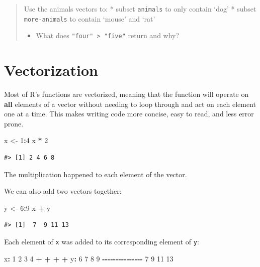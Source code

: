 \documentclass[
]{book}
\newenvironment{Shaded}{\begin{snugshade}}{\end{snugshade}}
\newcommand{\DecValTok}[1]{\textcolor[rgb]{0.00,0.00,0.81}{#1}}
\newcommand{\NormalTok}[1]{#1}
\newcommand{\OtherTok}[1]{\textcolor[rgb]{0.56,0.35,0.01}{#1}}
\newcommand{\SpecialCharTok}[1]{\textcolor[rgb]{0.81,0.36,0.00}{\textbf{#1}}}
\providecommand{\tightlist}{%
  \setlength{\itemsep}{0pt}\setlength{\parskip}{0pt}}
\begin{document}
\begin{quote}
Use the animals vectors to:
* subset \texttt{animals} to only contain `dog'
* subset \texttt{more-animals} to contain `mouse' and `rat'

\begin{itemize}
\tightlist
\item
  What does \texttt{"four"\ \textgreater{}\ "five"} return and why?
\end{itemize}
\end{quote}

\section{Vectorization}\label{vectorization}

Most of R's functions are vectorized, meaning that the function will operate on \textbf{all} elements of a vector without needing to loop through and act on each element one at a time. This makes writing code more concise, easy to read, and less error prone.

\begin{Shaded}
\begin{Highlighting}[]
\NormalTok{x }\OtherTok{\textless{}{-}} \DecValTok{1}\SpecialCharTok{:}\DecValTok{4}
\NormalTok{x }\SpecialCharTok{*} \DecValTok{2}
\end{Highlighting}
\end{Shaded}

\begin{verbatim}
#> [1] 2 4 6 8
\end{verbatim}

The multiplication happened to each element of the vector.

We can also add two vectors together:

\begin{Shaded}
\begin{Highlighting}[]
\NormalTok{y }\OtherTok{\textless{}{-}} \DecValTok{6}\SpecialCharTok{:}\DecValTok{9}
\NormalTok{x }\SpecialCharTok{+}\NormalTok{ y}
\end{Highlighting}
\end{Shaded}

\begin{verbatim}
#> [1]  7  9 11 13
\end{verbatim}

Each element of \texttt{x} was added to its corresponding element of \texttt{y}:

\begin{Shaded}
\begin{Highlighting}[]
\NormalTok{x}\SpecialCharTok{:}  \DecValTok{1}  \DecValTok{2}  \DecValTok{3}  \DecValTok{4}
    \SpecialCharTok{+}  \SpecialCharTok{+}  \SpecialCharTok{+}  \SpecialCharTok{+}
\NormalTok{y}\SpecialCharTok{:}  \DecValTok{6}  \DecValTok{7}  \DecValTok{8}  \DecValTok{9}
\SpecialCharTok{{-}{-}{-}{-}{-}{-}{-}{-}{-}{-}{-}{-}{-}{-}{-}}
    \DecValTok{7}  \DecValTok{9} \DecValTok{11} \DecValTok{13}
\end{Highlighting}
\end{Shaded}
\end{document}
